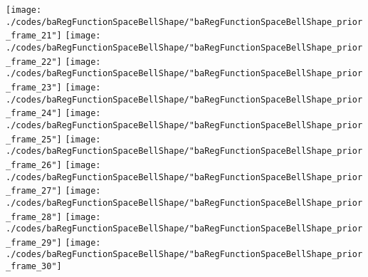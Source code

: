 \begin{frame}{\insertsection}
\begin{center}
{\begin{animateinline}{20}
				 \texttt{[image: ./codes/baRegFunctionSpaceBellShape/"baRegFunctionSpaceBellShape\_prior\_frame\_21"]}\newframe
				 \texttt{[image: ./codes/baRegFunctionSpaceBellShape/"baRegFunctionSpaceBellShape\_prior\_frame\_22"]}\newframe
				 \texttt{[image: ./codes/baRegFunctionSpaceBellShape/"baRegFunctionSpaceBellShape\_prior\_frame\_23"]}\newframe
				 \texttt{[image: ./codes/baRegFunctionSpaceBellShape/"baRegFunctionSpaceBellShape\_prior\_frame\_24"]}\newframe
				 \texttt{[image: ./codes/baRegFunctionSpaceBellShape/"baRegFunctionSpaceBellShape\_prior\_frame\_25"]}\newframe
				 \texttt{[image: ./codes/baRegFunctionSpaceBellShape/"baRegFunctionSpaceBellShape\_prior\_frame\_26"]}\newframe
				 \texttt{[image: ./codes/baRegFunctionSpaceBellShape/"baRegFunctionSpaceBellShape\_prior\_frame\_27"]}\newframe
				 \texttt{[image: ./codes/baRegFunctionSpaceBellShape/"baRegFunctionSpaceBellShape\_prior\_frame\_28"]}\newframe
				 \texttt{[image: ./codes/baRegFunctionSpaceBellShape/"baRegFunctionSpaceBellShape\_prior\_frame\_29"]}\newframe
				 \texttt{[image: ./codes/baRegFunctionSpaceBellShape/"baRegFunctionSpaceBellShape\_prior\_frame\_30"]}
			 \end{animateinline}
			}
	\end{center}
    
\end{frame}

